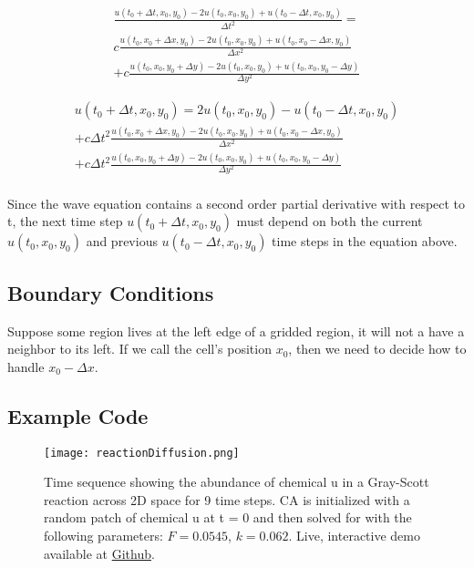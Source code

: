 { \begin{multline}
\frac{u(t_{0} + \Delta  t,x_{0},y_{0})- 2u(t_{0},x_{0},y_{0}) + u(t_{0} -\Delta  t,x_{0},y_{0})}{\Delta  t^{2}} = \\
c\frac{u(t_{0},x_{0} + \Delta  x,y_{0})- 2u(t_{0},x_{0},y_{0}) + u(t_{0},x_{0} -\Delta  x,y_{0})}{\Delta  x^{2}}\\
+c\frac{u(t_{0},x_{0},y_{0}+ \Delta  y)- 2u(t_{0},x_{0},y_{0}) + u(t_{0},x_{0},y_{0} -\Delta  y)}{\Delta  y^{2}}
  \end{multline}
  
   \begin{multline}\label{eq:wavefda2d}
u(t_{0} + \Delta  t,x_{0},y_{0})  = 2u(t_{0},x_{0},y_{0})-u(t_{0} -\Delta  t,x_{0},y_{0})\\
+c\Delta  t^{2}\frac{u(t_{0},x_{0} + \Delta  x,y_{0})- 2u(t_{0},x_{0},y_{0}) + u(t_{0},x_{0} -\Delta  x,y_{0})}{\Delta  x^{2}}\\
+c\Delta  t^{2}\frac{u(t_{0},x_{0},y_{0}+ \Delta  y)- 2u(t_{0},x_{0},y_{0}) + u(t_{0},x_{0},y_{0} -\Delta  y)}{\Delta  y^{2}}
  \end{multline}
\\
Since the wave equation contains a second order partial derivative with respect to t, the next time step $u(t_{0} + \Delta  t,x_{0},y_{0})$ must depend on both the current $u(t_{0},x_{0},y_{0})$ and previous $u(t_{0}-\Delta t,x_{0},y_{0})$ time steps in the equation above.

\subsection{Boundary Conditions}

Suppose some region lives at the left edge of a gridded region, it will not a have a neighbor to its left.  If we call the cell's position $x_{0}$, then we need to decide how to handle $x_{0}-\Delta x$.

\subsection{Example Code}

\begin{figure}
  \texttt{[image: reactionDiffusion.png]}
  \caption{Time sequence showing the abundance of chemical u in a Gray-Scott reaction across 2D space for 9 time steps.  CA is initialized with a random patch of chemical u at t = 0 and then solved for with the following parameters: $F = 0.0545$, $k=0.062$.  Live, interactive demo available at \href{http://git.amandaghassaei.com/ReactionDiffusionShader/}{Github}.}
  \label{fig:grayScott}
\end{figure}

}
